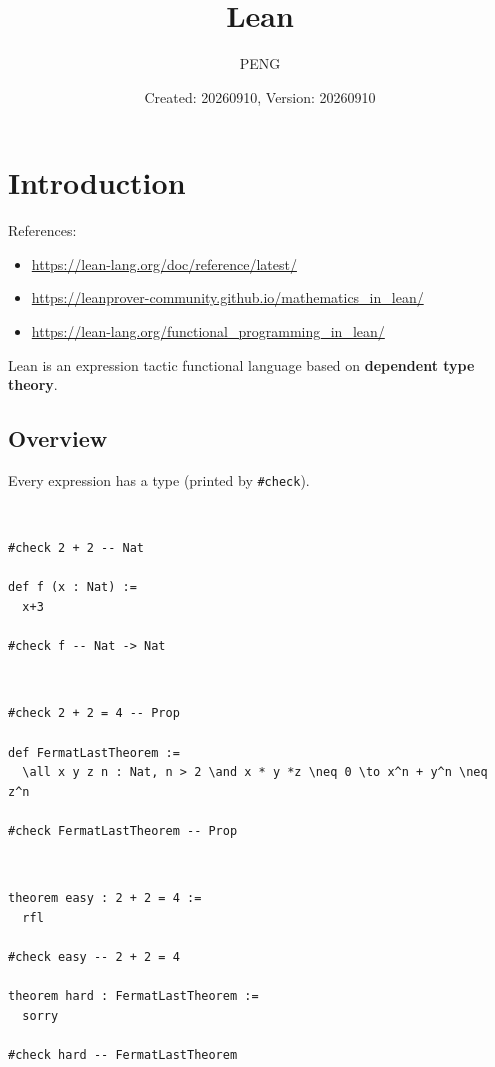 \documentclass{article}
\title{Lean}
\author{PENG}
\date{Created: 20260910, Version: 20260910}
\begin{document}
\maketitle
\tableofcontents
\section{Introduction}
References:
\begin{itemize}
    \item \url{https://lean-lang.org/doc/reference/latest/}
    \item \url{https://leanprover-community.github.io/mathematics_in_lean/}
    \item \url{https://lean-lang.org/functional_programming_in_lean/}
\end{itemize}

Lean is an expression tactic functional language based on \textbf{dependent type theory}.

\subsection{Overview}
Every expression has a type (printed by \verb|#check|).

\begin{definition}~
    \begin{verbatim}
#check 2 + 2 -- Nat

def f (x : Nat) :=
  x+3

#check f -- Nat -> Nat
\end{verbatim}
\end{definition}

\begin{definition}~
    \begin{verbatim}
#check 2 + 2 = 4 -- Prop

def FermatLastTheorem :=
  \all x y z n : Nat, n > 2 \and x * y *z \neq 0 \to x^n + y^n \neq z^n

#check FermatLastTheorem -- Prop
\end{verbatim}
\end{definition}

\begin{definition}~
    \begin{verbatim}
theorem easy : 2 + 2 = 4 :=
  rfl

#check easy -- 2 + 2 = 4

theorem hard : FermatLastTheorem :=
  sorry

#check hard -- FermatLastTheorem
\end{verbatim}
\end{definition}
\end{document}
